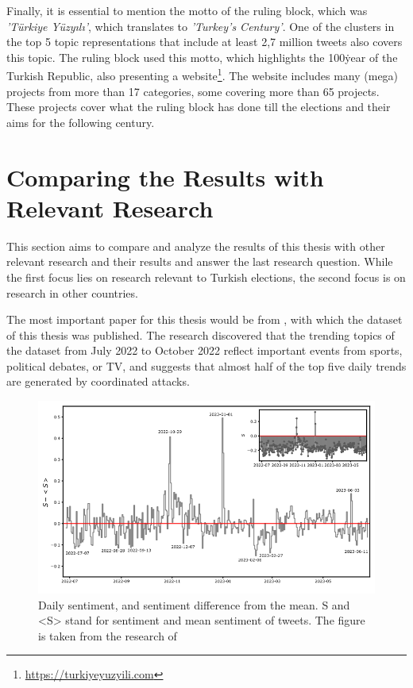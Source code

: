 Finally, it is essential to mention the motto of the ruling block, which was 
\textit{'Türkiye Yüzyılı'}, which translates to \textit{'Turkey's Century'}. One of the clusters 
in the top 5 topic representations that include at least 2,7 million tweets also covers this topic. 
The ruling block used this motto, which highlights the 100\. year of the Turkish Republic, also 
presenting a website\footnote{\url{https://turkiyeyuzyili.com}}. The website includes many 
(mega) projects from more than 17 categories, some covering more than 65 projects. 
These projects cover what the ruling block has done till the elections and their aims for the 
following century.



\section{Comparing the Results with Relevant Research}

This section aims to compare and analyze the results of this thesis with other relevant research and 
their results and answer the last research question. While the first focus lies on research relevant 
to Turkish elections, the second focus is on research in other countries.

The most important paper for this thesis would be from \textcite{secim2023}, with which the dataset 
of this thesis was published. The research discovered that the trending topics of the dataset from 
July 2022 to October 2022 reflect important events from sports, political debates, or TV, and 
suggests that almost half of the top five daily trends are generated by coordinated attacks. 

\begin{figure}[h!]
    \centering
    \includegraphics[width=\linewidth]{figures/sentiment_plot.png}
    \caption[Daily sentiment analysis]
    {Daily sentiment, and sentiment difference from the mean. S and <S> stand for sentiment and mean 
    sentiment of tweets. The figure is taken
    from the research of \textcite{turkishbertweet_2023}}\label{fig:sentiment_analysis}
\end{figure}

